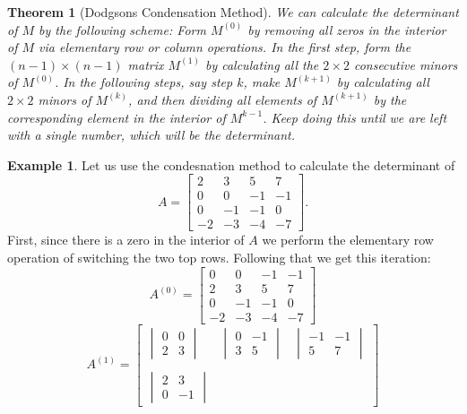 \documentclass[a4paper,12pt]{book}
\theoremstyle{plain}
\newtheorem{thm}[equation]{Theorem}
\theoremstyle{definition}
\newtheorem{Example}[equation]{Example}
\begin{document}
\begin{thm}[Dodgsons Condensation Method]
	We can calculate the determinant of \( M \) by the following scheme:
	Form \( M^{(0)} \) by removing all zeros in the interior of \( M \) via elementary row or
	column operations.
	In the first step, form the \( (n-1) \times (n-1) \) matrix \( M^{(1)} \) by calculating all the
	\( 2 \times 2 \) consecutive minors of \( M^{(0)} \). In the following steps, say step \( k \),
	make \( M^{(k+1)} \) by calculating all \( 2 \times 2 \) minors of \( M^{(k)} \), and then
	 dividing
	all elements of \( M^{(k+1)} \) by the corresponding element in the interior of \( M^{k-1} \).
	Keep doing this until we are left with a single number, which will be the determinant.
\end{thm}

\begin{Example}
	Let us use the condesnation method to calculate the determinant of
	\[
		A = \begin{bmatrix}
			2 & 3 & 5 & 7 \\
			0 & 0 & -1 & -1 \\
			0 & -1 & -1 & 0 \\
			-2 & -3 & -4 & -7
		\end{bmatrix}.
	\]
	First, since there is a zero in the interior of \( A \) we perform the elementary row operation
	of switching the two top rows. Following that we get this iteration:
	\[
		A^{(0)} = \begin{bmatrix}
			0 & 0 & -1 & -1 \\
			2 & 3 & 5 & 7 \\
			0 & -1 & -1 & 0 \\
			-2 & -3 & -4 & -7
		\end{bmatrix}
	\]
	\[
		A^{(1)} = \begin{bmatrix}
			\begin{vmatrix}
				0 & 0 \\ 2 & 3
			\end{vmatrix} & \begin{vmatrix}
				0 & -1 \\ 3 & 5
			\end{vmatrix} & \begin{vmatrix}
				-1 & -1 \\ 5 & 7
			\end{vmatrix} \\ & & \\ \begin{vmatrix}
				2 & 3 \\ 0 & -1

\end{vmatrix}
\end{bmatrix}\]
\end{Example}
\end{document}
